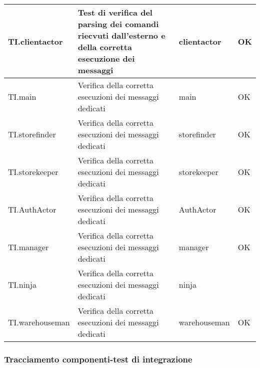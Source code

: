 \documentclass{scalatekids-article}
\begin{document}
\begin{longtable}[H]{| l | p{10cm} | l | l |}
  \hline
  TI.clientactor & Test di verifica del parsing dei comandi riecvuti dall'esterno e della corretta esecuzione dei messaggi & clientactor & OK\\
  \hline
  TI.main & Verifica della corretta esecuzioni dei messaggi dedicati & main & OK\\
  \hline
  TI.storefinder & Verifica della corretta esecuzioni dei messaggi dedicati & storefinder & OK\\
  \hline
  TI.storekeeper & Verifica della corretta esecuzioni dei messaggi dedicati & storekeeper & OK\\
  \hline
  TI.AuthActor & Verifica della corretta esecuzioni dei messaggi dedicati & AuthActor & OK\\
  \hline
  TI.manager & Verifica della corretta esecuzioni dei messaggi dedicati & manager & OK \\
  \hline
  TI.ninja & Verifica della corretta esecuzioni dei messaggi dedicati & ninja & \\
  \hline
  TI.warehouseman & Verifica della corretta esecuzioni dei messaggi dedicati & warehouseman & OK\\
  \hline
\end{longtable}

\subsubsection{Tracciamento componenti-test di integrazione}
\end{document}
